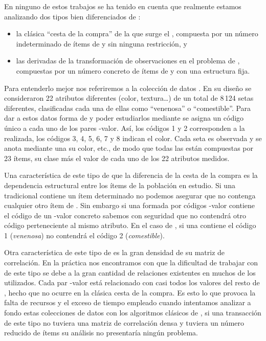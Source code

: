 En ninguno de estos trabajos se ha tenido en cuenta que realmente estamos analizando dos tipos bien diferenciados de \transacciones:
\begin{itemize}
  \item la clásica "`cesta de la compra"' de la que surge el \ARM, compuesta por un número indeterminado de ítems de \I y sin ninguna restricción, y
  \item las \transacciones derivadas de la transformación de observaciones en el problema de \Clasificacion, compuestas por un número concreto de ítems de \I y con una estructura fija.
\end{itemize}

Para entenderlo mejor nos referiremos a la colección de datos \mushroom. En su diseño se consideraron 22 atributos diferentes (color, textura\ldots) de un total de 8\,124 setas diferentes, clasificadas cada una de ellas como "`venenosa"' o "`comestible"'. Para dar a estos datos forma de \transaccion y poder estudiarlos mediante \ARM se asigna un código único a cada uno de los pares \atributo-valor. Así, los códigos 1 y 2 corresponden a la \clasificacion realizada, los códigos 3, 4, 5, 6, 7 y 8 indican el color. Cada seta es observada y se anota mediante una \transaccion su color, etc., de modo que todas las \transacciones están compuestas por 23 ítems, su clase más el valor de cada uno de los 22 atributos medidos.

Una característica de este tipo de \transaccion que la diferencia de la cesta de la compra es la dependencia estructural entre los ítems de la población en estudio. Si una \transaccion tradicional contiene un ítem determinado no podemos asegurar que no contenga cualquier otro ítem de \I. Sin embargo si una \transaccion formada por códigos \atributo-valor contiene el código de un \atributo-valor concreto sabemos con seguridad que no contendrá otro código perteneciente al mismo atributo. En el caso de \mushroom, si una \transaccion contiene el código 1 (\emph{venenosa}) no contendrá el código 2 (\emph{comestible}).

Otra característica de este tipo de \transacciones es la gran densidad de su matriz de correlación. En la práctica nos encontramos con que la dificultad de trabajar con \transacciones de este tipo se debe a la gran cantidad de relaciones existentes en muchos de los \datasets utilizados. Cada par \atributo-valor está relacionado con casi todos los valores del resto de \atributos, hecho que no ocurre en la clásica cesta de la compra. Es esto lo que provoca la falta de recursos y el exceso de tiempo empleado cuando intentamos analizar a fondo estas colecciones de datos con los algoritmos clásicos de \ARM, si una transacción de este tipo no tuviera una matriz de correlación densa y tuviera un número reducido de ítems su análisis no presentaría ningún problema.

